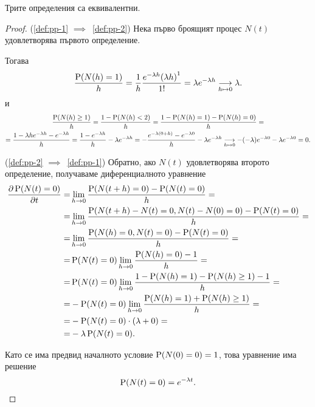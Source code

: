 \documentclass[numbers=endperiod, DIV=15, bibliography=totocnumbered]{scrartcl}
\begin{document}
\begin{theorem}
  Трите определения са еквивалентни.
\end{theorem}
\begin{proof}
  (\ref{def:pp-1} $\implies$~\ref{def:pp-2}) Нека първо броящият процес $N(t)$ удовлетворява първото определение.

  Тогава
  \begin{displaymath}
    \frac {\operatorname{P}(N(h) = 1)} h
    =
    \frac 1 h \frac {e^{-\lambda h} {(\lambda h)}^1} {1!}
    =
    \lambda e^{-\lambda h}
    \underset {h \mapsto 0} \longrightarrow
    \lambda.
  \end{displaymath}
  и
  \begin{multline*}
    \frac {\operatorname{P}(N(h) \geq 1)} h
    =
    \frac {1 - \operatorname{P}(N(h) < 2)} h
    =
    \frac {1 - \operatorname{P}(N(h) = 1) - \operatorname{P}(N(h) = 0)} h
    = \\ =
    \frac {1 - \lambda h e^{-\lambda h} - e^{-\lambda h}} h
    =
    \frac {1 - e^{-\lambda h}} h - \lambda e^{-\lambda h}
    =
    - \frac {e^{-\lambda (0 + h)} - e^{-\lambda 0}} h - \lambda e^{-\lambda h}
    \underset {h \mapsto 0} \longrightarrow
    -(-\lambda) e^{-\lambda 0} - \lambda e^{-\lambda 0}
    =
    0.
  \end{multline*}

  (\ref{def:pp-2} $\implies$~\ref{def:pp-1}) Обратно, ако $N(t)$ удовлетворява второто определение, получаваме диференциалното уравнение
  \begin{align*}
    \frac {\partial \operatorname{P}(N(t) = 0)} {\partial t}
    =&
    \lim_{h \to 0} \frac {\operatorname{P}(N(t+h) = 0) - \operatorname{P}(N(t) = 0)} h
    = \\ =&
    \lim_{h \to 0} \frac {\operatorname{P}(N(t+h) - N(t) = 0, N(t) - N(0) = 0) - \operatorname{P}(N(t) = 0)} h
    = \\ =&
    \lim_{h \to 0} \frac {\operatorname{P}(N(h) = 0, N(t) = 0) - \operatorname{P}(N(t) = 0)} h
    = \\ =&
    \operatorname{P}(N(t) = 0) \lim_{h \to 0} \frac {\operatorname{P}(N(h) = 0) - 1} h
    = \\ =&
    \operatorname{P}(N(t) = 0) \lim_{h \to 0} \frac {1 - \operatorname{P}(N(h) = 1) - \operatorname{P}(N(h) \geq 1) - 1} h
    = \\ =&
    - \operatorname{P}(N(t) = 0) \lim_{h \to 0} \frac {\operatorname{P}(N(h) = 1) + \operatorname{P}(N(h) \geq 1)} h
    = \\ =&
    - \operatorname{P}(N(t) = 0) \cdot (\lambda + 0)
    = \\ =&
    -\lambda \operatorname{P}(N(t) = 0).
  \end{align*}

  Като се има предвид началното условие $\operatorname{P}(N(0) = 0) = 1$, това уравнение има решение
  \begin{displaymath}
   \operatorname{P}(N(t) = 0) = e^{-\lambda t}.
  \end{displaymath}


\end{proof}
\end{document}
